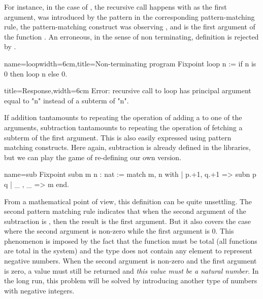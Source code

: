 For instance, in the case of , the recursive call happens
with  as the first argument,  was introduced by the pattern 
in the corresponding pattern-matching rule, the pattern-matching
construct was observing , and  is the first argument of the
function .  An erroneous, in the sense of non terminating,
definition is rejected by \Coq{}.

\begin{coq}{name=loop}{width=6cm,title=Non-terminating program}
Fixpoint loop n :=
 if n is 0 then loop n else 0.
$~$
\end{coq}
\begin{coqout}{}{title=Response,width=6cm}
Error: recursive call to loop has
principal argument equal to  "n"
instead of a subterm of "n".
\end{coqout}

% 
% 
If addition tantamounts to repeating the operation of adding a 
to one of the arguments, subtraction tantamounts to repeating the
operation of fetching a subterm of the first argument.  This is also
easily expressed using pattern matching constructs.  Here again,
subtraction is already defined in the libraries, but we can play the game
of re-defining our own version.

\begin{coq}{name=sub}{}
Fixpoint subn m n : nat :=
  match m, n with
  | p.+1, q.+1 => subn p q
  | _ , _ => m
  end.
\end{coq}
From a mathematical point of view, this definition can be quite
unsettling.  The second pattern matching rule indicates that when
the second argument of the subtraction is , then the result is
the first argument.  But it also covers the case where the second
argument is non-zero while the first argument is 0.  This phenomenon
is imposed by the fact that the function must be total (all functions
are total in the \Coq{} system) and the type  does not contain any
element to represent negative numbers.  When the second argument is non-zero
and the first argument is zero, a value must still be returned and
{\em this value must be a natural number}.  In the long run, this
problem will be solved by introducing another type of numbers with
negative integers.

